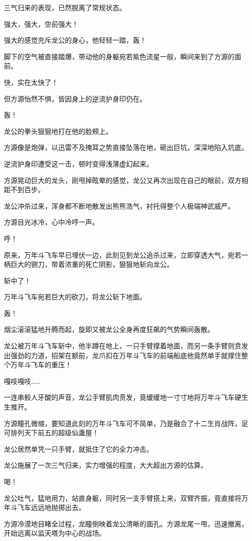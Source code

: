 \begin{this_body}
三气归来的表现，已然脱离了常规状态。

强大，强大，空前强大！

强大的感觉充斥龙公的身心，他轻轻一踏，轰！

脚下的空气被直接踏爆，带动他的身躯宛若紫色流星一般，瞬间来到了方源的面前。

快，实在太快了！

但方源怡然不惧，皆因身上的逆流护身印仍在。

轰！

龙公的拳头狠狠地打在他的脸颊上。

方源像是炮弹，以迅雷不及掩耳之势直接坠落在地，砸出巨坑，深深地陷入坑底。

逆流护身印遭受这一击，顿时变得浅薄虚幻起来。

方源晃动巨大的龙头，刚甩掉眩晕的感觉，龙公又再次出现在自己的眼前，双方相距不到百步。

龙公冲杀过来，浑身都不断地散发出熊熊浩气，衬托得整个人极端神武威严。

方源目光冰冷，心中冷哼一声。

呼！

原来，万年斗飞车早已埋伏一边，此刻见到龙公追杀过来，立即穿透大气，宛若一柄巨大的铡刀，带着浓重的死亡阴影，狠狠地斩向龙公。

斩中了！

万年斗飞车宛若巨大的砍刀，将龙公斩下地面。

轰！

烟尘滚滚猛地升腾而起，旋即又被龙公全身再度狂飙的气势瞬间轰散。

龙公被万年斗飞车斩中，他半蹲在地上，一只手臂撑着地面，而另一条手臂则贲发出强劲的力道，招架在额前，龙爪扣在万年斗飞车的前端船底他竟然单手就撑住整个万年斗飞车的重压！

嘎吱嘎吱……

一连串鲛人牙酸的声音，龙公手臂肌肉贲发，竟缓缓地一寸寸地将万年斗飞车硬生生推开。

方源瞳孔微缩，要知道此刻的万年斗飞车可不简单，乃是融合了十二生肖战阵，足可排列天下前五的超级仙蛊屋！

龙公居然单凭一只手臂，就抵住了它的全力冲击。

龙公施展了一次三气归来，实力增强的程度，大大超出方源的估算。

喝！

龙公吐气，猛地用力，站直身躯，同时另一支手臂搭上来，双臂齐振，竟直接将万年斗飞车远远地抛掷出去。

方源冷漠地目睹全过程，龙瞳倒映着龙公清晰的面孔。方源龙尾一甩，迅速撤离，开始远离以监天塔为中心的战场。


\end{this_body}
